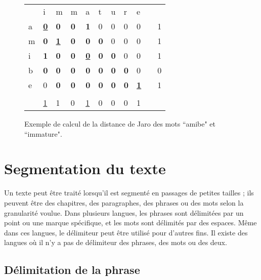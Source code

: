 \documentclass{KodeBook}
\begin{document}
\begin{figure}[ht]
\begin{minipage}{0.45\textwidth}
\begin{tabular}{|l|l|l|l|l|l|l|l|l|l|l|}
	\cline{1-9}
	  & i & m & m & a & t & u & r & e & \multicolumn{2}{l}{ }\\
	\cline{1-9}\cline{11-11}
	a & \underline{\textbf{0}} & \textbf{0} & \textbf{0} & \textbf{1} & 0 & 0 & 0 & 0 & & 1\\
	\cline{1-9}\cline{11-11}
	m & \textbf{0} & \underline{\textbf{1}} & \textbf{0} & \textbf{0} & \textbf{0} & 0 & 0 & 0 & & 1\\
	\cline{1-9}\cline{11-11}
	i & \textbf{1} & \textbf{0} & \textbf{0} & \underline{\textbf{0}} & \textbf{0} & \textbf{0} & 0 & 0 & & 1\\
	\cline{1-9}\cline{11-11}
	b & \textbf{0} & \textbf{0} & \textbf{0} & \textbf{0} & \textbf{0} & \textbf{0} & \textbf{0} & 0 & & 0\\
	\cline{1-9}\cline{11-11}
	e & 0 & \textbf{0} & \textbf{0} & \textbf{0} & \textbf{0} & \textbf{0} & \textbf{0} & \underline{\textbf{1}} & & 1\\
	\cline{1-9}\cline{11-11}
	\multicolumn{11}{l}{ }\\
	\cline{2-9}
	\multicolumn{1}{l|}{} & \underline{1} & 1 & 0 & \underline{1} & 0 & 0 & 0 & 1 & \multicolumn{2}{l}{ }\\
	\cline{2-9}
\end{tabular}
\end{minipage}
\caption[Exemple de calcul de la distance de Jaro.]{Exemple de calcul de la distance de Jaro des mots ``amibe"  et ``immature".}
\label{fig:jaro}
\end{figure}

\section{Segmentation du texte}

Un texte peut être traité lorsqu'il est segmenté en passages de petites tailles ; ils peuvent être des chapitres, des paragraphes, des phrases ou des mots selon la granularité voulue.
Dans plusieurs langues, les phrases sont délimitées par un point ou une marque spécifique, et les mots sont délimités par des espaces. 
Même dans ces langues, le délimiteur peut être utilisé pour d'autres fins. 
Il existe des langues où il n'y a pas de délimiteur des phrases, des mots ou des deux.

\subsection{Délimitation de la phrase}
\end{document}
